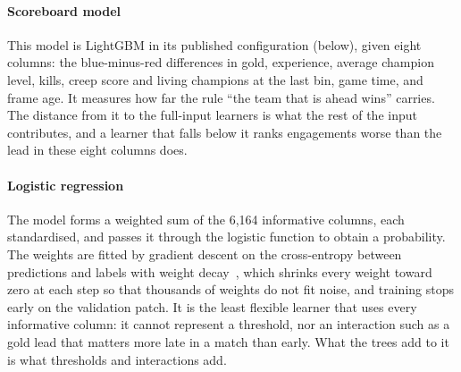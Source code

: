 \paragraph{Scoreboard model}
This model is LightGBM in its published configuration (below), given eight columns: the blue-minus-red
differences in gold, experience, average champion level, kills, creep score and living champions at the
last bin, game time, and frame age. It measures how far the rule ``the team that is ahead wins'' carries.
The distance from it to the full-input learners is what the rest of the input contributes, and a learner
that falls below it ranks engagements worse than the lead in these eight columns does.

\paragraph{Logistic regression}
The model forms a weighted sum of the 6,164 informative columns, each standardised, and passes it
through the logistic function to obtain a probability. The weights are fitted by gradient descent on the
cross-entropy between predictions and labels with weight decay~\cite{loshchilov2019decoupled}, which
shrinks every weight toward zero at each step so that thousands of weights do not fit noise, and
training stops early on the validation patch. It is the least flexible learner that uses every
informative column: it cannot represent a threshold, nor an interaction such as a gold lead that matters
more late in a match than early. What the trees add to it is what thresholds and interactions add.

